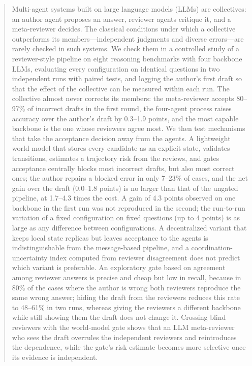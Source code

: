 \documentclass[manuscript, screen, review]{acmart}
\begin{document}
\begin{abstract}
Multi-agent systems built on large language models (LLMs) are collectives: an author agent proposes an answer, reviewer agents critique it, and a meta-reviewer decides.
The classical conditions under which a collective outperforms its members---independent judgments and diverse errors---are rarely checked in such systems.
We check them in a controlled study of a reviewer-style pipeline on eight reasoning benchmarks with four backbone LLMs, evaluating every configuration on identical questions in two independent runs with paired tests, and logging the author's first draft so that the effect of the collective can be measured within each run.
The collective almost never corrects its members: the meta-reviewer accepts 80--97\% of incorrect drafts in the first round, the four-agent process raises accuracy over the author's draft by 0.3--1.9 points, and the most capable backbone is the one whose reviewers agree most.
We then test mechanisms that take the acceptance decision away from the agents.
A lightweight world model that stores every candidate as an explicit state, validates transitions, estimates a trajectory risk from the reviews, and gates acceptance centrally blocks most incorrect drafts, but also most correct ones; the author repairs a blocked error in only 7--23\% of cases, and the net gain over the draft (0.0--1.8 points) is no larger than that of the ungated pipeline, at 1.7--4.3 times the cost.
A gain of 4.3 points observed on one backbone in the first run was not reproduced in the second; the run-to-run variation of a fixed configuration on fixed questions (up to 4 points) is as large as any difference between configurations.
A decentralized variant that keeps local state replicas but leaves acceptance to the agents is indistinguishable from the message-based pipeline, and a coordination-uncertainty index computed from reviewer disagreement does not predict which variant is preferable.
An exploratory gate based on agreement among reviewer answers is precise and cheap but low in recall, because in 80\% of the cases where the author is wrong both reviewers reproduce the same wrong answer; hiding the draft from the reviewers reduces this rate to 48--61\% in two runs, whereas giving the reviewers a different backbone while still showing them the draft does not change it. Crossing blind reviewers with the world-model gate shows that an LLM meta-reviewer who sees the draft overrules the independent reviewers and reintroduces the dependence, while the gate's risk estimate becomes more selective once its evidence is independent.

\end{abstract}
\end{document}
